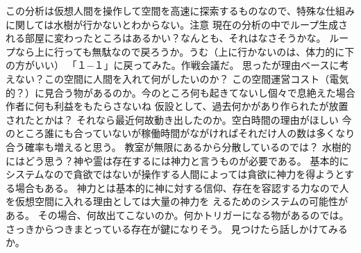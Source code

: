 \documentclass[uplatex]{utbook}
\begin{document}
この分析は仮想人間を操作して空間を高速に探索するものなので、特殊な仕組みに関しては水樹が行かないとわからない。注意
現在の分析の中でループ生成される部屋に変わったところはあるかい？なんとも、それはなさそうかな。
ループなら上に行っても無駄なので戻ろうか。うむ（上に行かないのは、体力的に下の方がいい）
「１−１」に戻ってみた。作戦会議だ。
思ったが理由ベースに考えない？この空間に人間を入れて何がしたいのか？
この空間運営コスト（電気的？）に見合う物があるのか。今のところ何も起きてないし個々で息絶えた場合作者に何も利益をもたらさないね
仮設として、過去何かがあり作られたが放置されたとかは？
それなら最近何故動き出したのか。空白時間の理由がほしい
今のところ誰にも合っていないが稼働時間がながければそれだけ人の数は多くなり合う確率も増えると思う。
教室が無限にあるから分散しているのでは？
水樹的にはどう思う？神や霊は存在するには神力と言うものが必要である。
基本的にシステムなので貪欲ではないが操作する人間によっては貪欲に神力を得ようとする場合もある。
神力とは基本的に神に対する信仰、存在を容認する力なので人を仮想空間に入れる理由としては大量の神力を
えるためのシステムの可能性がある。
その場合、何故出てこないのか。何かトリガーになる物があるのでは。
さっきからつきまとっている存在が鍵になりそう。
見つけたら話しかけてみるか。
\end{document}
